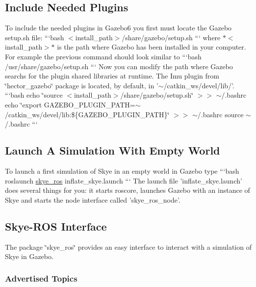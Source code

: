 {\ttfamily \subsection*{Include Needed Plugins}}

{\ttfamily  To include the needed plugins in Gazebo6 you first must locate the Gazebo setup.\-sh file\-: ```bash $<$install\-\_\-path$>$/share/gazebo/setup.sh ``` where $\ast$$<$install\-\_\-path$>$$\ast$ is the path where Gazebo has been installed in your computer. For example the previous command should look similar to ```bash /usr/share/gazebo/setup.sh ``` Now you can modify the path where Gazebo searchs for the plugin shared libraries at runtime. The Imu plugin from \char`\"{}hector\-\_\-gazebo\char`\"{} package is located, by default, in '$\sim$/catkin\-\_\-ws/devel/lib/'. ```bash echo \char`\"{}source $<$install\-\_\-path$>$/share/gazebo/setup.\-sh\char`\"{} $>$$>$ $\sim$/.bashrc echo \char`\"{}export G\-A\-Z\-E\-B\-O\-\_\-\-P\-L\-U\-G\-I\-N\-\_\-\-P\-A\-T\-H=$\sim$/catkin\-\_\-ws/devel/lib\-:\$\{\-G\-A\-Z\-E\-B\-O\-\_\-\-P\-L\-U\-G\-I\-N\-\_\-\-P\-A\-T\-H\}\char`\"{} $>$$>$ $\sim$/.bashrc source $\sim$/.bashrc ```}

{\ttfamily \subsection*{Launch A Simulation With Empty World}}

{\ttfamily  To launch a first simulation of Skye in an empty world in Gazebo type ```bash roslaunch \hyperlink{namespaceskye__ros}{skye\-\_\-ros} inflate\-\_\-skye.\-launch ``` The launch file 'inflate\-\_\-skye.\-launch' does several things for you\-: it starts roscore, launches Gazebo with an instance of Skye and starts the node interface called 'skye\-\_\-ros\-\_\-node'.}

{\ttfamily \subsection*{Skye-\/\-R\-O\-S Interface}}

{\ttfamily  The package \char`\"{}skye\-\_\-ros\char`\"{} provides an easy interface to interact with a simulation of Skye in Gazebo.}

{\ttfamily \subsubsection*{Advertised Topics}}


